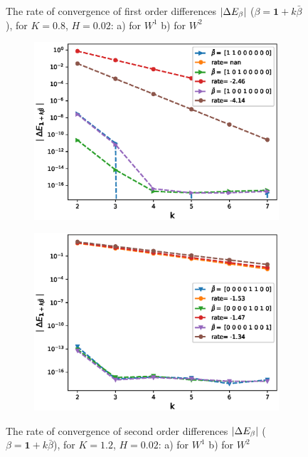 \documentclass[11pt]{article}
\begin{document}
\begin{figure}[h!]
\caption{The rate of convergence of  first order differences $\left\lvert\Delta E_{\beta}\right\rvert$ ($\beta=\mathbf{1}+k \bar{\beta}$), for $K=0.8$, $H=0.02$: a) for $W^1$ b) for $W^2$}
\label{fig:first_diff_comp_K_12_H_002_wihtout_change_measure}
\end{figure}


\begin{figure}[h!]
\centering
\begin{subfigure}{.4\textwidth}
\centering
\includegraphics[width=1\linewidth]{./figures/rBergomi_mixed_error_rates/without_change_measure/N_4/H_002/mixed_difference_order2_rbergomi_4steps_H_002_K_12_totally_hierarch_with_rate_W1}
\caption{}
\label{fig:sub3}
\end{subfigure}%
\begin{subfigure}{.4\textwidth}
\centering
\includegraphics[width=1\linewidth]{./figures/rBergomi_mixed_error_rates/without_change_measure/N_4/H_002/mixed_difference_order2_rbergomi_4steps_H_002_K_12_totally_hierarch_with_rate_W2}
\caption{}
\label{fig:sub4}
\end{subfigure}

\caption{The rate of convergence of  second order differences $\left\lvert\Delta E_{\beta}\right\rvert$ ($\beta=\mathbf{1}+k \bar{\beta}$), for $K=1.2$, $H=0.02$: a) for $W^1$ b) for $W^2$}
\label{fig:second_diff_comp_K_12_H_002_wihtout_change_measure}
\end{figure}
\end{document}
